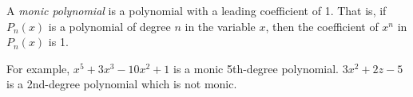 \documentclass{article}
\begin{document}
A \emph{monic polynomial} is a polynomial with a leading coefficient of 1.  That is, if $P_n(x)$ is a polynomial of degree $n$ in the variable $x$, then the coefficient of $x^n$ in $P_n(x)$ is 1.

For example, $x^5+3x^3-10x^2+1$ is a monic 5th-degree polynomial.  $3x^2+2z-5$ is a 2nd-degree polynomial which is not monic.
\end{document}
